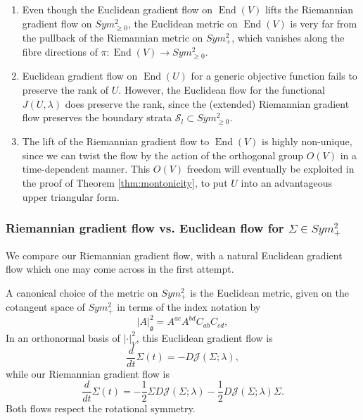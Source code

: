 \documentclass[a4paper]{article}
\theoremstyle{definition}
\newcommand{\1}{\mathbbm{1}}
\DeclareMathOperator{\End}{End}
\DeclareMathOperator{\Tr}{Tr}
\begin{document}
	\begin{enumerate}
		\item  	Even though the Euclidean gradient flow on $\End(V)$ lifts the Riemannian gradient flow on $Sym^2_{\geq 0}$, the Euclidean metric on $\End(V)$ is very far from the pullback of the Riemannian metric on $Sym^2_+$, which vanishes along the fibre directions of $\pi: \End(V)\to Sym^2_{\geq 0}$.
		
		
		\item Euclidean gradient flow on $\End(U)$  for a generic objective function fails to preserve the rank of $U$. However, the Euclidean flow for  the functional $J(U,\lambda)$ does preserve the rank, since  the (extended) Riemannian gradient flow preserves the boundary strata $\mathcal{S}_l\subset Sym^2_{\geq 0}$.
		
		
		\item The lift of the Riemannian gradient flow to $\End(V)$ is highly non-unique, since we can twist the flow by the action of the orthogonal group $O(V)$ in a time-dependent manner. This $O(V)$  freedom will eventually be exploited in the proof of Theorem \ref{thm:montonicity}, to put $U$ into an advantageous upper triangular form.
	\end{enumerate}
	
	
	
	\subsubsection{Riemannian gradient flow vs. Euclidean flow for $\Sigma\in Sym^2_+$}
	
	
	We compare our Riemannian gradient flow, with a natural  Euclidean gradient flow which one may come across in the first attempt.
	
	
	A canonical choice of the metric on $Sym^2_+$ is the Euclidean metric, given on the cotangent space of $Sym^2_+$ in terms of the index notation by
	\[
	|A|_{\mathfrak{g}}^2= A^{ac} A^{bd} C_{ab} C_{cd},
	\]
	In an orthonormal basis of $|\cdot|_V^2$, this Euclidean gradient flow is
	\[
	\frac{d}{dt}\Sigma(t)= - D\mathcal{J}(\Sigma;\lambda),
	\]
	while our Riemannian gradient flow is
	\[
	\frac{d}{dt}\Sigma(t)= -\frac{1}{2}\Sigma D\mathcal{J}(\Sigma;\lambda)-  \frac{1}{2}D\mathcal{J}(\Sigma;\lambda) \Sigma. 
	\]
	Both flows respect the rotational symmetry. 
	
	
	
\end{document}

